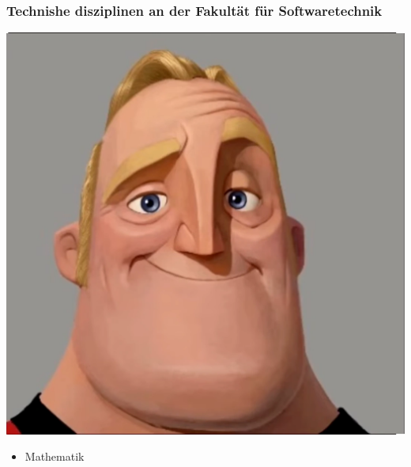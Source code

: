 \documentclass{beamer}
\begin{document}
\begin{frame}
\frametitle{Technishe disziplinen an der Fakultät für Softwaretechnik}
\begin{minipage}{0.5\textwidth}
\includegraphics[width=\textwidth]{img/good.png}
\end{minipage}
\begin{minipage}{0.45\textwidth}
    \begin{itemize}
        \item<1-> Mathematik

\end{itemize}
\end{minipage}
\end{frame}
\end{document}
